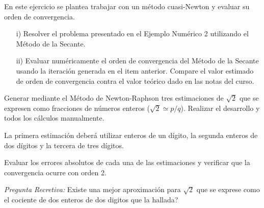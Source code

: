 \bigskip
\begin{exercise}
	
	En este ejercicio se plantea trabajar con un método cuasi-Newton y evaluar su orden de convergencia.
	\begin{itemize}
		\item[i)] Resolver el problema presentado en el Ejemplo Numérico 2 utilizando el Método de la Secante.
		
		\item[ii)] Evaluar numéricamente el orden de convergencia del Método de la Secante usando la iteración generada en el item anterior. Compare el valor estimado de orden de convergencia contra el valor teórico dado en las notas del curso.
		
	\end{itemize}
	
\end{exercise}


\bigskip
\begin{exercise}
	
	Generar mediante el Método de Newton-Raphson tres estimaciones de $\sqrt{2}$ que se expresen como fracciones de números enteros ($\sqrt{2}\simeq p/q$). Realizar el desarrollo y todos los cálculos manualmente.
	
	La primera estimación deberá utilizar enteros de un dígito, la segunda enteros de dos dígitos y la tercera de tres dígitos.
	
	Evaluar los errores absolutos de cada una de las estimaciones y verificar que la convergencia ocurre con orden 2.
	
	\smallskip
	
	\textit{Pregunta Recretiva:} \textquestiondown Existe una mejor aproximación para $\sqrt{2}$ que se exprese como el cociente de dos enteros de dos digitos que la hallada? 
	\bigskip
\end{exercise}




